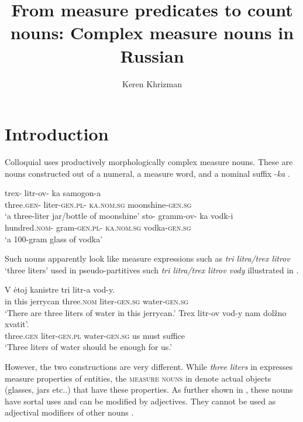\documentclass[output=paper]{langscibook}
\author{Keren Khrizman\affiliation{Bar-Ilan University}}
\title[From measure predicates to count nouns]{From measure predicates to count nouns: Complex measure nouns in Russian}
\begin{document}
\maketitle

%


\section{Introduction}
Colloquial  uses productively morphologically complex measure nouns. These are nouns constructed out of a numeral, a measure word, and a nominal suffix -\textit{ka} .

\ea\label{ex:khrizmann:1}
    \ea\label{ex:khrizmann:1a} \gll trex- litr-ov- ka samogon-a\\
    three.\textsc{gen}- liter-\textsc{gen.pl}- \textsc{ka.nom.sg} moonshine-\textsc{gen.sg}\\
    \glt `a three-liter jar/bottle of moonshine'
    \ex\label{ex:khrizmann:1b} \gll sto- gramm-ov- ka vodk-i\\
    hundred.\textsc{nom}- gram-\textsc{gen.pl}- \textsc{ka.nom.sg} vodka-\textsc{gen.sg}\\
    \glt `a 100-gram glass of vodka'
\z\z

\noindent Such nouns apparently look like measure expressions such as \textit{tri litra/trex litrov} `three liters' used in pseudo-partitives such \textit{tri litra/trex litrov vody} illustrated in .

\ea\label{ex:khrizmann:2}
    \ea\label{ex:khrizmann:2a} \gll V ėtoj kanistre tri litr-a vod-y.\\
    in this jerrycan three.\textsc{nom} liter-\textsc{gen.sg} water-\textsc{gen.sg}\\
    \glt `There are three liters of water in this jerrycan.'
    \ex\label{ex:khrizmann:2b} \gll Trex litr-ov vod-y nam dolžno xvatit’.\\
    three.\textsc{gen} liter-\textsc{gen.pl} water-\textsc{gen.sg} us must suffice\\
    \glt `Three liters of water should be enough for us.'
\z\z

\noindent However, the two constructions are very different. While \textit{three liters} in  expresses measure properties of entities, the \textsc{measure nouns} in  denote actual objects (glasses, jars etc..) that have these properties. As further shown in , these nouns have sortal uses and can be modified by adjectives. They cannot be used as adjectival modifiers of other nouns .
\end{document}
